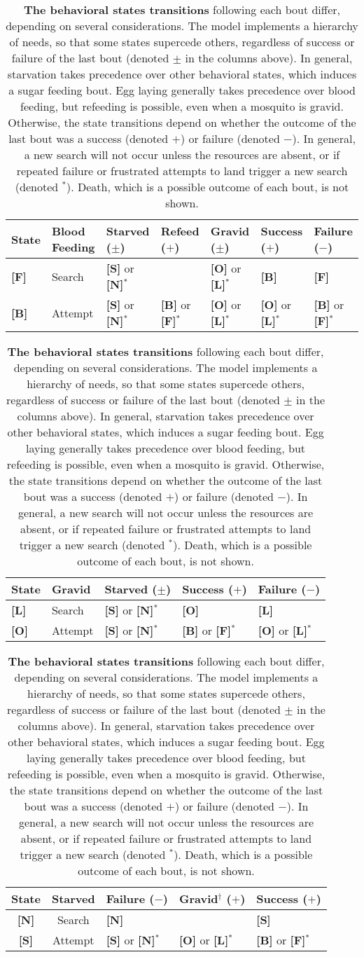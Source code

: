 

\begin{table}

\begin{tabular}{|l|l|l|l|l|l|l|} \hline 

{\bf State} & {\bf Blood Feeding}   & {\bf Starved} ($\pm$) & {\bf Refeed} ($+$)&  {\bf Gravid} ($\pm$) & {\bf Success} ($+$)& {\bf Failure} ($-$) \\ \hline \hline  
%
{\bf [F]}  & Search &  {\bf [S]} or {\bf [N]}$^*$ && {\bf [O]} or {\bf [L]}$^*$ & {\bf [B]}& {\bf [F]}\\ 
%
{\bf [B]}    & Attempt&  {\bf [S]} or {\bf [N]}$^*$ &{\bf [B]} or {\bf [F]}$^*$ &{\bf [O]} or {\bf [L]}$^*$ & {\bf [O]} or {\bf [L]}$^*$ &   {\bf [B]} or {\bf [F]}$^*$   \\ \hline \hline

\end{tabular}

\vspace{0.1in}

\begin{tabular}{|l|l|l|l|l|} \hline 
{\bf State} & {\bf Gravid}  &  {\bf Starved} ($\pm$) & {\bf Success} ($+$) & {\bf Failure} ($-$)\\ \hline \hline  
{\bf [L]} & Search&{\bf [S]} or {\bf [N]}$^*$ &   {\bf [O]}& {\bf [L]}\\ 
{\bf [O]} & Attempt &{\bf [S]} or {\bf [N]}$^*$&{\bf [B]} or {\bf [F]}$^*$ & {\bf [O]} or {\bf [L]}$^*$\\ \hline
\hline 
\end{tabular}

\vspace{0.1in}

\begin{tabular}{|c|c|l|l|l|} \hline 
{\bf State} & {\bf Starved}  & {\bf Failure} ($-$) &  {\bf Gravid}$^\dag$ ($+$)& {\bf Success} ($+$) \\ \hline \hline  
{\bf [N]} & Search & {\bf [N]}  & &{\bf [S]} \\ 
{\bf [S]} & Attempt & {\bf [S]} or {\bf [N]}$^*$ & {\bf [O]} or {\bf [L]}$^*$ & {\bf [B]} or {\bf [F]}$^*$ \\ \hline \hline 
\end{tabular}

\vspace{0.1in}

\caption{{\bf The behavioral states transitions} following each bout differ, depending on several considerations. The model implements a hierarchy of needs, so that some states supercede others, regardless of success or failure of the last bout (denoted $\pm$ in the columns above). In general, starvation takes precedence over other behavioral states, which induces a sugar feeding bout. Egg laying generally takes precedence over blood feeding, but refeeding is possible, even when a mosquito is gravid. Otherwise, the state transitions depend on whether the outcome of the last bout was a success (denoted $+$)  or failure (denoted $-$). In general, a new search will not occur unless the resources are absent, or if repeated failure or frustrated attempts to land trigger a new search (denoted $^*$). Death, which is a possible outcome of each bout, is not shown. 
 }

\label{fig:behavioralStates}
\end{table} 

